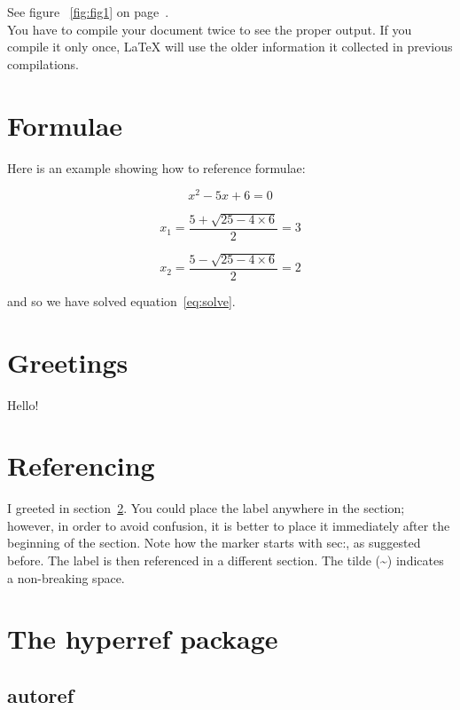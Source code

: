 \documentclass{article}
\begin{document}
See figure ~\ref{fig:fig1} on page~\pageref{fig:fig1}.\\
You have to compile your document twice to see the proper output. If you compile it only once, LaTeX will use the older information it collected in previous compilations.

\section{Formulae}
\label{sec:Formulae}

Here is an example showing how to reference formulae:

\begin{equation} \label{eq:solve}
x^2 - 5 x + 6 = 0
\end{equation}

\begin{equation}
x_1 = \frac{5 + \sqrt{25 - 4 \times 6}}{2} = 3
\end{equation}

\begin{equation}
x_2 = \frac{5 - \sqrt{25 - 4 \times 6}}{2} = 2
\end{equation}

and so we have solved equation~\ref{eq:solve}.

\section{Greetings}
\label{sec:greetings}

Hello!

\section{Referencing}

I greeted in section~\ref{sec:greetings}.
You could place the label anywhere in the section; however, in order to avoid confusion, it is better to place it immediately after the beginning of the section. Note how the marker starts with sec:, as suggested before. The label is then referenced in a different section. The tilde (\textasciitilde) indicates a non-breaking space.

\section{The hyperref package}
\subsection{autoref}
\end{document}

